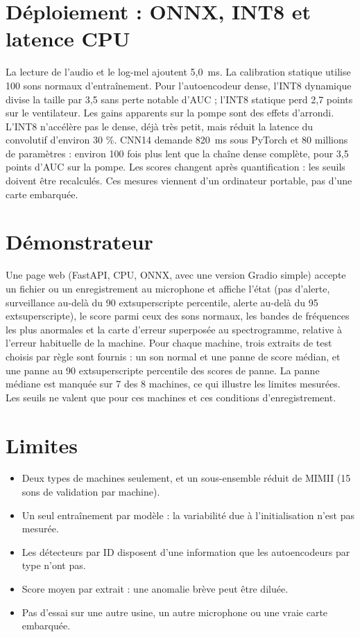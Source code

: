 \documentclass[11pt,a4paper]{article}
\begin{document}
\section{Déploiement : ONNX, INT8 et latence CPU}
\begin{table}[H]\centering
\caption{Taille, AUC (\%) et latence du modèle par extrait de 10~s (médiane de 200 mesures, 1 thread, Intel i5-10300H).}

\end{table}
La lecture de l'audio et le log-mel ajoutent 5,0~ms. La calibration statique utilise 100 sons normaux d'entraînement. Pour l'autoencodeur dense, l'INT8 dynamique divise la taille par 3,5 sans
perte notable d'AUC ; l'INT8 statique perd 2,7 points sur le ventilateur. Les gains apparents sur la pompe sont des effets d'arrondi. L'INT8 n'accélère pas le dense, déjà très petit, mais réduit la
latence du convolutif d'environ 30 \%. CNN14 demande 820~ms sous PyTorch et 80 millions de paramètres : environ 100 fois plus lent que la
chaîne dense complète, pour 3,5 points d'AUC sur la pompe. Les scores changent après quantification : les seuils doivent être recalculés.
Ces mesures viennent d'un ordinateur portable, pas d'une carte embarquée.

\section{Démonstrateur}
Une page web (FastAPI, CPU, ONNX, avec une version Gradio simple) accepte un fichier ou un enregistrement au microphone et affiche l'état
(pas d'alerte, surveillance au-delà du 90	extsuperscript{e} percentile, alerte au-delà du 95	extsuperscript{e}), le score parmi ceux des sons normaux, les bandes de fréquences les plus anormales
et la carte d'erreur superposée au spectrogramme, relative à l'erreur habituelle de la machine. Pour chaque machine, trois extraits de test choisis par règle sont fournis : un son normal et une panne de score médian, et une panne au 90	extsuperscript{e} percentile des scores de panne.
La panne médiane est manquée sur 7 des 8 machines, ce qui illustre les limites mesurées. Les seuils ne valent que pour ces machines et ces conditions d'enregistrement.

\section{Limites}
\begin{itemize}
\item Deux types de machines seulement, et un sous-ensemble réduit de MIMII (15 sons de validation par machine).
\item Un seul entraînement par modèle : la variabilité due à l'initialisation n'est pas mesurée.
\item Les détecteurs par ID disposent d'une information que les autoencodeurs par type n'ont pas.
\item Score moyen par extrait : une anomalie brève peut être diluée.
\item Pas d'essai sur une autre usine, un autre microphone ou une vraie carte embarquée.
\end{itemize}
\end{document}
